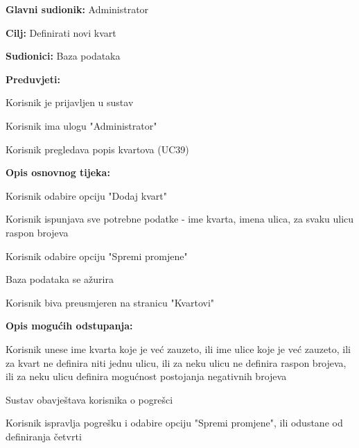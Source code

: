 					\noindent {}
					\begin{packed_item}
	
						\item \textbf{Glavni sudionik: }Administrator
						\item  \textbf{Cilj:} Definirati novi kvart
						\item  \textbf{Sudionici:} Baza podataka
						\item  \textbf{Preduvjeti:}
						\item[] \begin{packed_enum}
							\item Korisnik je prijavljen u sustav
							\item Korisnik ima ulogu "Administrator"
							\item Korisnik pregledava popis kvartova (UC39)
						\end{packed_enum}
						\item  \textbf{Opis osnovnog tijeka:}
						
						\item[] \begin{packed_enum}
	
							\item Korisnik odabire opciju "Dodaj kvart"
							\item Korisnik ispunjava sve potrebne podatke - ime kvarta, imena ulica, za svaku ulicu raspon brojeva
							\item Korisnik odabire opciju "Spremi promjene"
							\item Baza podataka se ažurira
							\item Korisnik biva preusmjeren na stranicu "Kvartovi"
						\end{packed_enum}
						
						\item  \textbf{Opis mogućih odstupanja:}
						
						\item[] \begin{packed_item}
	
							\item[3.a] Korisnik unese ime kvarta koje je već zauzeto, ili ime ulice koje je već zauzeto, ili za kvart ne definira niti jednu ulicu, ili za neku ulicu ne definira raspon brojeva, ili za neku ulicu definira mogućnost postojanja negativnih brojeva
							\item[] \begin{packed_enum}
								
								\item Sustav obavještava korisnika o pogrešci
								\item Korisnik ispravlja pogrešku i odabire opciju "Spremi promjene", ili odustane od definiranja četvrti
								
							\end{packed_enum}
							
						\end{packed_item}
					\end{packed_item}
					
